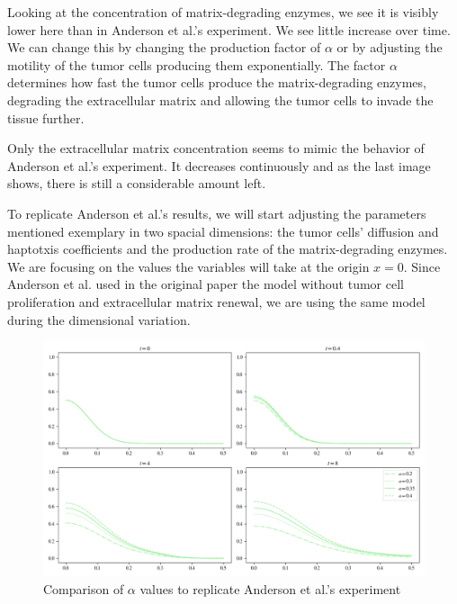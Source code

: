 Looking at the concentration of matrix-degrading enzymes, we see it is visibly lower here than in Anderson et al.'s experiment. We see little increase over time. We can change this by changing the production factor of $\alpha$ or by adjusting the motility of the tumor cells producing them exponentially. The factor $\alpha$ determines how fast the tumor cells produce the matrix-degrading enzymes, degrading the extracellular matrix and allowing the tumor cells to invade the tissue further.

Only the extracellular matrix concentration seems to mimic the behavior of Anderson et al.'s experiment. It decreases continuously and as the last image shows, there is still a considerable amount left.

To replicate Anderson et al.'s results, we will start adjusting the parameters mentioned exemplary in two spacial dimensions: the tumor cells' diffusion and haptotxis coefficients and the production rate of the matrix-degrading enzymes. We are focusing on the values the variables will take at the origin $x=0$. Since Anderson et al. used in the original paper the model without tumor cell proliferation and extracellular matrix renewal, we are using the same model during the dimensional variation.

\begin{figure}[!htb]
 \centering
 \includegraphics[width=\textwidth]{resources/images/alpha_comparison.png}
 \caption{Comparison of $\alpha$ values to replicate Anderson et al.'s experiment}
 \label{fig:replication_alpha_comparison}
\end{figure}

